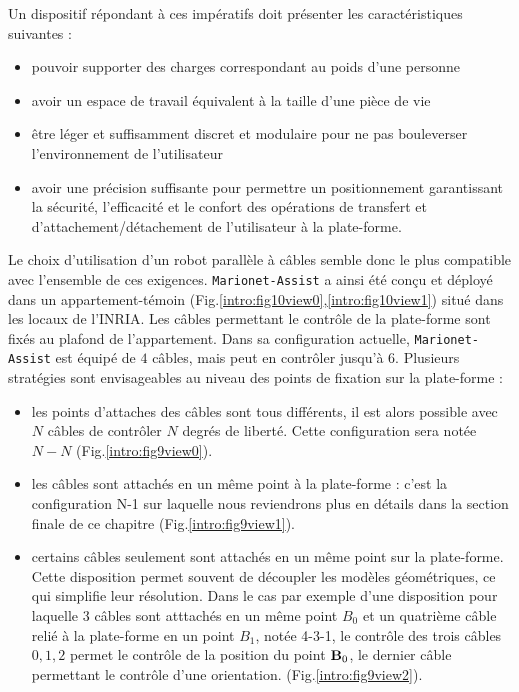 Un dispositif répondant à ces impératifs doit présenter les caractéristiques 
suivantes :
\begin{itemize}
 \item pouvoir supporter des charges correspondant au poids d'une personne
 \item avoir un espace de travail équivalent à la taille d'une pièce de vie
 \item être léger et suffisamment discret et modulaire pour ne pas bouleverser 
l'environnement de l'utilisateur
 \item avoir une précision suffisante pour permettre un positionnement 
garantissant la sécurité, l'efficacité et le confort des opérations de 
transfert 
et d'attachement/détachement de l'utilisateur à la plate-forme.
\end{itemize}

Le choix d'utilisation d'un robot parallèle à câbles semble donc le plus 
compatible avec l'ensemble de ces exigences. {\tt Marionet-Assist} a ainsi été 
conçu et déployé dans un appartement-témoin 
(Fig.\ref{intro:fig10view0},\ref{intro:fig10view1}) situé dans les locaux 
de l'INRIA. Les câbles permettant le contrôle de la plate-forme sont fixés au 
plafond de l'appartement. Dans sa configuration actuelle, {\tt Marionet-Assist} 
est équipé de $4$ câbles, mais peut en contrôler jusqu'à $6$. Plusieurs 
stratégies sont envisageables au niveau des points de fixation sur la 
plate-forme :
\begin{itemize}
 \item les points d'attaches des câbles sont tous différents, il est alors 
possible avec $N$ câbles de contrôler $N$ degrés de liberté. Cette 
configuration sera notée $N-N$ (Fig.\ref{intro:fig9view0}).
 \item les câbles sont attachés en un même point à la plate-forme : c'est la 
configuration N-1 sur laquelle nous reviendrons plus en d\'etails dans la 
section finale de ce chapitre (Fig.\ref{intro:fig9view1}).
 \item certains câbles seulement sont attachés en un même point sur la 
plate-forme. Cette disposition permet souvent de découpler les modèles 
géomé\-triques, ce qui simplifie leur résolution. Dans le cas par exemple d'une 
disposition pour laquelle $3$ câbles sont atttachés en un même point $B_0$ et un 
quatrième câble relié à la 
plate-forme en un point $B_1$, notée 4-3-1, le contrôle des trois câbles $0, 1, 
2$ permet le contrôle de la position du point ${\bf B}_0$, le dernier câble 
permettant le contrôle d'une orientation. 
(Fig.\ref{intro:fig9view2}).
\end{itemize}

